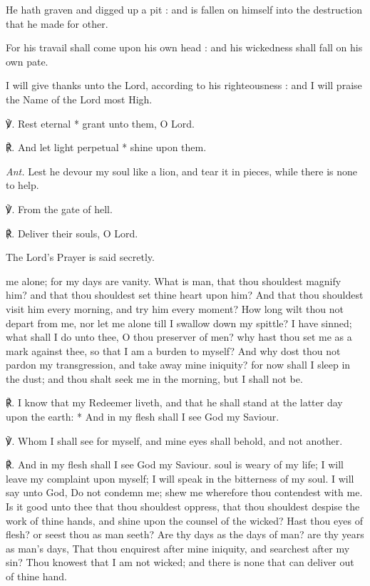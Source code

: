 He hath graven and digged up a pit : and is fallen on himself into the destruction that he made for other.\par
{}For his travail shall come upon his own head : and his wickedness shall fall on his own pate.\par
{}I will give thanks unto the Lord, according to his righteousness : and I will praise the Name of the Lord most High.\par
℣. Rest eternal * grant unto them, O Lord.\par
℟. And let light perpetual * shine upon them.\par\noindent
\textit{Ant.} Lest he devour my soul like a lion, and tear it in pieces, while there is none to help.\par
\vspace{0.5\baselineskip}
℣. From the gate of hell.\par
℟. Deliver their souls, O Lord.\par
\begin{rubric}
    {The Lord's Prayer is said secretly.}
\end{rubric}
 me alone; for my days are vanity. What is man, that thou shouldest magnify him? and that thou shouldest set thine heart upon him? And that thou shouldest visit him every morning, and try him every moment? How long wilt thou not depart from me, nor let me alone till I swallow down my spittle? I have sinned; what shall I do unto thee, O thou preserver of men? why hast thou set me as a mark against thee, so that I am a burden to myself? And why dost thou not pardon my transgression, and take away mine iniquity? for now shall I sleep in the dust; and thou shalt seek me in the morning, but I shall not be.
\par
℟. I know {\dag} that my Redeemer liveth, and that he shall stand at the latter day upon the earth: * And in my flesh shall I see God my Saviour.\par
℣. Whom I shall see for myself, and mine eyes shall behold, and not another.\par
℟. And in my flesh shall I see God my Saviour.
 soul is weary of my life; I will leave my complaint upon myself; I will speak in the bitterness of my soul. I will say unto God, Do not condemn me; shew me wherefore thou contendest with me. Is it good unto thee that thou shouldest oppress, that thou shouldest despise the work of thine hands, and shine upon the counsel of the wicked? Hast thou eyes of flesh? or seest thou as man seeth? Are thy days as the days of man? are thy years as man's days, That thou enquirest after mine iniquity, and searchest after my sin? Thou knowest that I am not wicked; and there is none that can deliver out of thine hand.\par
